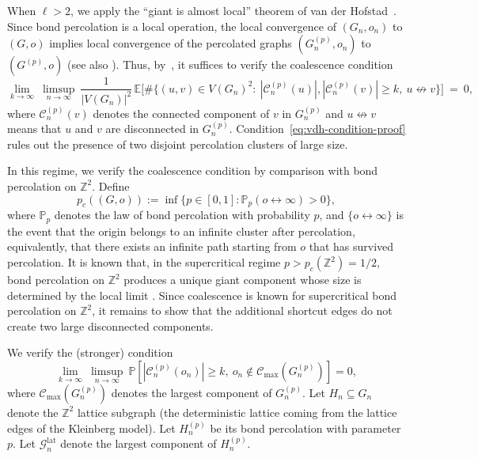 \documentclass[10pt]{amsart}
\begin{document}
When $\ell > 2$,
we apply the ``giant is almost local'' theorem of van der Hofstad~\cite{vanderhofstad2023giant}.
Since bond percolation is a local operation, the local convergence of $(G_n,o_n)$ to
$(G,o)$ implies local convergence of the percolated graphs
$(G_n^{(p)},o_n)$ to $(G^{(p)},o)$ (see also \cite[lemma 3.1]{yeganeh-digraph}).
Thus, by~\cite[Theorem~2.2]{vanderhofstad2023giant}, it suffices to verify the coalescence
condition
\begin{equation}\label{eq:vdh-condition-proof}
\lim_{k\to\infty}\ \limsup_{n\to\infty}\ \frac{1}{|V(G_n)|^2}\,
\mathbb E\Big[\#\big\{(u,v)\in V(G_n)^2:\ |\mathcal C_n^{(p)}(u)|,|\mathcal C_n^{(p)}(v)|\ge k,\
u\not\leftrightarrow v\big\}\Big]\ =\ 0,
\end{equation}
where $\mathcal C_n^{(p)}(v)$ denotes the connected component of $v$ in $G_n^{(p)}$ and
$u\not\leftrightarrow v$ means that $u$ and $v$ are disconnected in $G_n^{(p)}$. 
Condition~\eqref{eq:vdh-condition-proof} rules out the presence of two disjoint percolation
clusters of large size.

In this regime, we verify the coalescence condition by comparison with bond percolation on
$\mathbb Z^2$. Define
\[
p_c((G, o)):=\inf\{p\in[0,1]:\mathbb P_p(o\leftrightarrow\infty)>0\},
\]
where $\mathbb P_p$ denotes the law of bond percolation with probability $p$, and
$\{o\leftrightarrow\infty\}$ is the event that the origin belongs to an infinite cluster after percolation,
equivalently, that there exists an infinite path starting from $o$ that has survived percolation.
It is known that, in the supercritical regime $p>p_c(\mathbb Z^2)=1/2$, bond percolation on
$\mathbb Z^2$ produces a unique giant component whose size is determined by the local
limit \cite{borgs2000lattice}. 
Since coalescence is known for supercritical bond percolation on $\mathbb{Z}^2$, it remains to show that the additional shortcut edges do not create two large disconnected components.

We verify the (stronger) condition
\begin{equation}\label{eq:vdH-condition-2.42}
\lim_{k\to\infty}\ \limsup_{n\to\infty}\ \mathbb P\left[|\mathcal C_n^{(p)}(o_n)|\ge k,\ o_n\notin \mathcal C_{\max}(G_n^{(p)})\right]=0,
\end{equation}
where \(\mathcal C_{\max}(G_n^{(p)})\) denotes the largest component of \(G_n^{(p)}\). Let $H_n\subseteq G_n$ denote the $\mathbb{Z}^2$ lattice subgraph (the deterministic lattice coming from the lattice edges of the Kleinberg model).  Let $H_n^{(p)}$ be its bond percolation with parameter $p$.
Let $\mathcal G_n^{\mathrm{lat}}$ denote the largest component of $H_n^{(p)}$.
\end{document}
